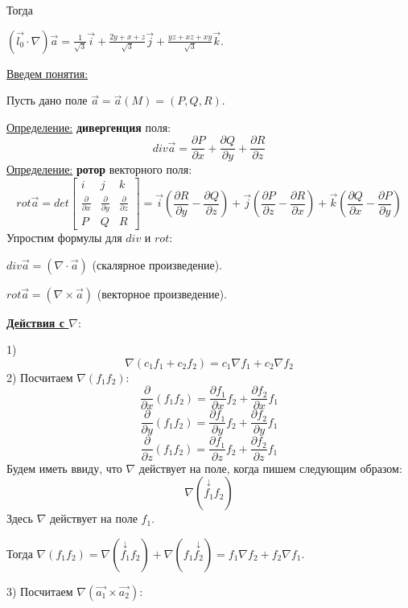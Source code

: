 \documentclass[12pt]{article}
\begin{document}
Тогда\par
$(\overrightarrow{l_0} \cdot \nabla)\overrightarrow{a} = \frac{1}{\sqrt{3}}\overrightarrow{i} + \frac{2y+x+z}{\sqrt{3}}\overrightarrow{j} + \frac{yz+xz+xy}{\sqrt{3}}\overrightarrow{k}$.\par
\uline{Введем понятия:}\par
Пусть дано поле $\overrightarrow{a} = \overrightarrow{a}(M) = (P,Q,R)$.\par
\uline{Определение:} \textbf{дивергенция} поля:
$$div\overrightarrow{a} = \frac{\partial P}{\partial x} + \frac{\partial Q}{\partial y} + \frac{\partial R}{\partial z}$$
\uline{Определение:} \textbf{ротор} векторного поля:
$$rot\overrightarrow{a} = det \begin{bmatrix} i & j & k \\ \frac{\partial}{\partial x} & \frac{\partial}{\partial y} & \frac{\partial}{\partial z} \\ P & Q & R \end{bmatrix} = \overrightarrow{i} (\frac{\partial R}{\partial y} - \frac{\partial Q}{\partial z}) + \overrightarrow{j}(\frac{\partial P}{\partial z} - \frac{\partial R}{\partial x}) + \overrightarrow{k}(\frac{\partial Q}{\partial x} - \frac{\partial P}{\partial y})$$
Упростим формулы для $div$ и $rot$:\par
$div \overrightarrow{a} = (\nabla \cdot \overrightarrow{a})$ (скалярное произведение).\par
$rot \overrightarrow{a} = (\nabla \times \overrightarrow{a})$ (векторное произведение).\par
\uline{\textbf{Действия с $\nabla$}}:\par
1) $$\nabla(c_1 f_1 + c_2 f_2) = c_1 {\nabla f_1} + c_2 {\nabla f_2}$$
2) Посчитаем $\nabla(f_1 f_2)$:
$$\frac{\partial}{\partial x}(f_1 f_2) = \frac{\partial f_1}{\partial x} f_2 + \frac{\partial f_2}{\partial x} f_1$$
$$\frac{\partial}{\partial y}(f_1 f_2) = \frac{\partial f_1}{\partial y} f_2 + \frac{\partial f_2}{\partial y} f_1$$
$$\frac{\partial}{\partial z}(f_1 f_2) = \frac{\partial f_1}{\partial z} f_2 + \frac{\partial f_2}{\partial z} f_1$$
Будем иметь ввиду, что $\nabla$ действует на поле, когда пишем следующим образом:
$$\nabla(\overset{\downarrow}{f_1} f_2)$$
Здесь $\nabla$ действует на поле $f_1$.\par
Тогда $\nabla(f_1 f_2) = \nabla(\overset{\downarrow}{f_1} f_2) + \nabla(f_1 \overset{\downarrow}{f_2}) = f_1 {\nabla f_2} + f_2 {\nabla f_1}$.\par
3) Посчитаем $\nabla(\overrightarrow{a_1} \times \overrightarrow{a_2})$:\par
\end{document}
